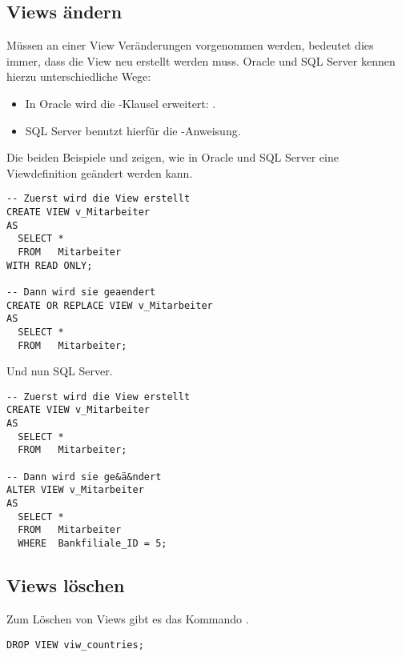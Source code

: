       \subsection{Views ändern}
        \label{alterview}
        Müssen an einer View Veränderungen vorgenommen werden, bedeutet dies immer, dass die View neu erstellt werden muss. Oracle und SQL Server kennen hierzu unterschiedliche Wege:
        \begin{itemize}
          \item In Oracle wird die -Klausel erweitert: .
          \item SQL Server benutzt hierfür die -Anweisung.
        \end{itemize}
        Die beiden Beispiele  und  zeigen, wie in Oracle und SQL Server eine Viewdefinition geändert werden kann.
        \begin{lstlisting}[language=oracle_sql,caption={Eine View ändern in Oracle},label=sql08_40]
-- Zuerst wird die View erstellt
CREATE VIEW v_Mitarbeiter
AS
  SELECT *
  FROM   Mitarbeiter
WITH READ ONLY;

-- Dann wird sie geaendert
CREATE OR REPLACE VIEW v_Mitarbeiter
AS
  SELECT *
  FROM   Mitarbeiter;
        \end{lstlisting}
\clearpage
        Und nun SQL Server.
        \begin{lstlisting}[language=ms_sql,caption={Eine View ändern in SQL
Server},label=sql08_41]
-- Zuerst wird die View erstellt
CREATE VIEW v_Mitarbeiter
AS
  SELECT *
  FROM   Mitarbeiter;

-- Dann wird sie ge&ä&ndert
ALTER VIEW v_Mitarbeiter
AS
  SELECT *
  FROM   Mitarbeiter
  WHERE  Bankfiliale_ID = 5;
        \end{lstlisting}
      \subsection{Views löschen}
        Zum Löschen von Views gibt es das Kommando .
        \begin{lstlisting}[language=ms_sql,caption={Eine View löschen},label=sql08_42]
DROP VIEW viw_countries;
        \end{lstlisting}
